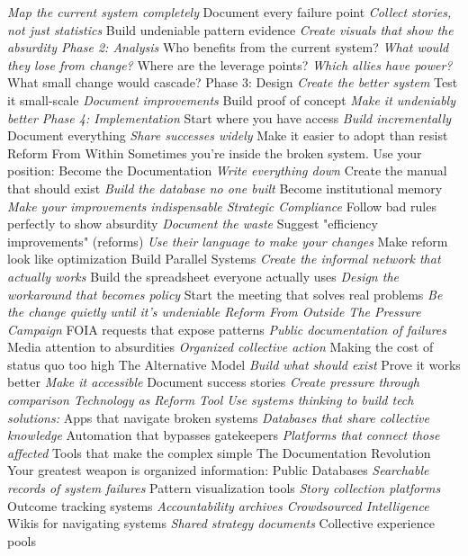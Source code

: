 \documentclass[12pt]{book}
\begin{document}
\textit{ Map the current system completely
} Document every failure point
\textit{ Collect stories, not just statistics
} Build undeniable pattern evidence
\textit{ Create visuals that show the absurdity
Phase 2: Analysis
} Who benefits from the current system?
\textit{ What would they lose from change?
} Where are the leverage points?
\textit{ Which allies have power?
} What small change would cascade?
Phase 3: Design
\textit{ Create the better system
} Test it small-scale
\textit{ Document improvements
} Build proof of concept
\textit{ Make it undeniably better
Phase 4: Implementation
} Start where you have access
\textit{ Build incrementally
} Document everything
\textit{ Share successes widely
} Make it easier to adopt than resist
Reform From Within
Sometimes you're inside the broken system. Use your position:
Become the Documentation
\textit{ Write everything down
} Create the manual that should exist
\textit{ Build the database no one built
} Become institutional memory
\textit{ Make your improvements indispensable
Strategic Compliance
} Follow bad rules perfectly to show absurdity
\textit{ Document the waste
} Suggest "efficiency improvements" (reforms)
\textit{ Use their language to make your changes
} Make reform look like optimization
Build Parallel Systems
\textit{ Create the informal network that actually works
} Build the spreadsheet everyone actually uses
\textit{ Design the workaround that becomes policy
} Start the meeting that solves real problems
\textit{ Be the change quietly until it's undeniable
Reform From Outside
The Pressure Campaign
} FOIA requests that expose patterns
\textit{ Public documentation of failures
} Media attention to absurdities
\textit{ Organized collective action
} Making the cost of status quo too high
The Alternative Model
\textit{ Build what should exist
} Prove it works better
\textit{ Make it accessible
} Document success stories
\textit{ Create pressure through comparison
Technology as Reform Tool
Use systems thinking to build tech solutions:
} Apps that navigate broken systems
\textit{ Databases that share collective knowledge
} Automation that bypasses gatekeepers
\textit{ Platforms that connect those affected
} Tools that make the complex simple
The Documentation Revolution
Your greatest weapon is organized information:
Public Databases
\textit{ Searchable records of system failures
} Pattern visualization tools
\textit{ Story collection platforms
} Outcome tracking systems
\textit{ Accountability archives
Crowdsourced Intelligence
} Wikis for navigating systems
\textit{ Shared strategy documents
} Collective experience pools
\end{document}
